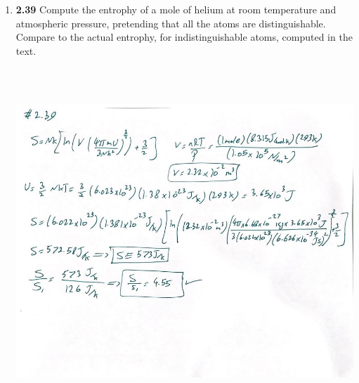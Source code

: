\documentclass[fleqn]{article}
\begin{document}
\begin{enumerate}
    \pagebreak

    \item \textbf{2.39} Compute the entrophy of a mole of helium at room temperature and atmospheric pressure, pretending that all 
    the atoms are distinguishable. Compare to the actual entrophy, for indistinguishable atoms, computed in the text.

    \begin{center}
      \includegraphics[height=13cm, width=14cm]{8.JPG}
    \end{center}

  \end{enumerate}
\end{document}
